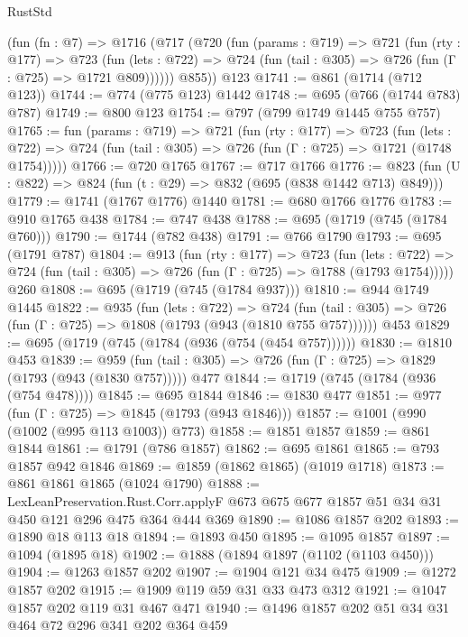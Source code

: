 \begin{lexlean}{RustStd}
\begin{coremodule}
    (fun (fn : @7) =>
    @1716
      (@717
        (@720
          (fun (params : @719) =>
          @721
            (fun (rty : @177) =>
            @723
              (fun (lets : @722) =>
              @724 (fun (tail : @305) => @726 (fun (Γ : @725) => @1721 @809))))))
        @855))
    @123
@1741 := @861 (@1714 (@712 @123))
@1744 := @774 (@775 @123) @1442
@1748 := @695 (@766 (@1744 @783) @787)
@1749 := @800 @123
@1754 := @797 (@799 @1749 @1445 @755 @757)
@1765 := fun (params : @719) =>
  @721
    (fun (rty : @177) =>
    @723
      (fun (lets : @722) =>
      @724 (fun (tail : @305) => @726 (fun (Γ : @725) => @1721 (@1748 @1754)))))
@1766 := @720 @1765
@1767 := @717 @1766
@1776 := @823 (fun (U : @822) => @824 (fun (t : @29) => @832 (@695 (@838 @1442 @713) @849)))
@1779 := @1741 (@1767 @1776) @1440
@1781 := @680 @1766 @1776
@1783 := @910 @1765 @438
@1784 := @747 @438
@1788 := @695 (@1719 (@745 (@1784 @760)))
@1790 := @1744 (@782 @438)
@1791 := @766 @1790
@1793 := @695 (@1791 @787)
@1804 := @913
    (fun (rty : @177) =>
    @723
      (fun (lets : @722) =>
      @724 (fun (tail : @305) => @726 (fun (Γ : @725) => @1788 (@1793 @1754)))))
    @260
@1808 := @695 (@1719 (@745 (@1784 @937)))
@1810 := @944 @1749 @1445
@1822 := @935
    (fun (lets : @722) =>
    @724 (fun (tail : @305) => @726 (fun (Γ : @725) => @1808 (@1793 (@943 (@1810 @755 @757))))))
    @453
@1829 := @695 (@1719 (@745 (@1784 (@936 (@754 (@454 @757))))))
@1830 := @1810 @453
@1839 := @959 (fun (tail : @305) => @726 (fun (Γ : @725) => @1829 (@1793 (@943 (@1830 @757))))) @477
@1844 := @1719 (@745 (@1784 (@936 (@754 @478))))
@1845 := @695 @1844
@1846 := @1830 @477
@1851 := @977 (fun (Γ : @725) => @1845 (@1793 (@943 @1846)))
@1857 := @1001 (@990 (@1002 (@995 @113 @1003)) @773)
@1858 := @1851 @1857
@1859 := @861 @1844
@1861 := @1791 (@786 @1857)
@1862 := @695 @1861
@1865 := @793 @1857 @942 @1846
@1869 := @1859 (@1862 @1865) (@1019 @1718)
@1873 := @861 @1861 @1865 (@1024 @1790)
@1888 := LexLeanPreservation.Rust.Corr.applyF
    @673
    @675
    @677
    @1857
    @51
    @34
    @31
    @450
    @121
    @296
    @475
    @364
    @444
    @369
@1890 := @1086 @1857 @202
@1893 := @1890 @18 @113 @18
@1894 := @1893 @450
@1895 := @1095 @1857
@1897 := @1094 (@1895 @18)
@1902 := @1888 (@1894 @1897 (@1102 (@1103 @450)))
@1904 := @1263 @1857 @202
@1907 := @1904 @121 @34 @475
@1909 := @1272 @1857 @202
@1915 := @1909 @119 @59 @31 @33 @473 @312
@1921 := @1047 @1857 @202 @119 @31 @467 @471
@1940 := @1496
    @1857
    @202
    @51
    @34
    @31
    @464
    @72
    @296
    @341
    @202
    @364
    @459

\end{coremodule}
\end{lexlean}
